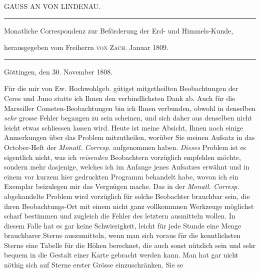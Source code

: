 \clearpage{}%
\begin{center}
{\small GAUSS AN VON LINDENAU.\par}
\medskip\hrule\medskip
{\small Monatliche Correspondenz zur Beförderung der Erd- und Himmels-Kunde,\par
herausgegeben vom Freiherrn \textsc{von Zach}. Januar 1809.\par}
\medskip\hrule
\end{center}\medskip
\begin{flushright}Göttingen, den 30. November 1808.\end{flushright}
Für die mir von Ew. Hochwohlgeb. gütigst mitgetheilten Beobachtungen der Ceres und Juno statte ich Ihnen den verbindlichsten Dank ab. Auch für die Marseiller Cometen-Beobachtungen bin ich Ihnen verbunden, obwohl in denselben \emph{sehr} grosse Fehler begangen zu sein scheinen, und sich daher aus denselben nicht leicht etwas schliessen lassen wird. Heute ist meine Absicht, Ihnen noch einige Anmerkungen über das Problem mitzutheilen, worüber Sie meinen Aufsatz in das October-Heft der \emph{Monatl. Corresp.} aufgenommen haben. \emph{Dieses} Problem ist es eigentlich nicht, was ich \emph{reisenden} Beobachtern vorzüglich empfehlen möchte, sondern mehr dasjenige, welches ich im Anfange jenes Aufsatzes erwähnt und in einem vor kurzem hier gedruckten Programm behandelt habe, wovon ich ein Exemplar beizulegen mir das Vergnügen mache. Das in der \emph{Monatl. Corresp.} abgehandelte Problem wird vorzüglich für solche Beobachter brauchbar sein, die ihren Beobachtungs-Ort mit einem nicht ganz vollkommnen Werkzeuge möglichst scharf bestimmen und zugleich die Fehler des letztern ausmitteln wollen. In diesem Falle hat es gar keine Schwierigkeit, leicht für jede Stunde eine Menge brauchbarer Sterne auszumitteln, wenn man sich voraus für die kenntlichsten Sterne eine Tabelle für die Höhen berechnet, die auch sonst nützlich sein und sehr bequem in die Gestalt einer Karte gebracht werden kann. Man hat gar nicht nöthig sich auf Sterne erster Grösse einzuschränken. Sie se%
%
